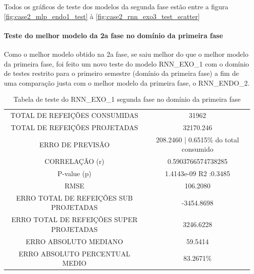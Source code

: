     	    Todos os gráficos de teste dos modelos da segunda fase estão entre a figura \ref{fig:case2_mlp_endo1_test} à \ref{fig:case2_rnn_exo3_test_scatter}

    	    \paragraph{Teste do melhor modelo da 2a fase no domínio da primeira fase}
    	        Como o melhor modelo obtido na 2a fase, se saiu melhor do que o melhor modelo da primeira fase, foi feito um novo teste do modelo RNN\_EXO\_1 com o domínio de testes restrito para o primeiro semestre (domínio da primeira fase) a fim de uma comparação justa com o melhor modelo da primeira fase, o RNN\_ENDO\_2.
    	        
                \begin{table}[!ht]
                \centering
                \caption{Tabela de teste do RNN\_EXO\_1 segunda fase no domínio da primeira fase}
                \label{table:case2_rnn_exo_2_incase1}
                    \begin{tabular}{|c|c|}
                    \rowcolor{gray!50}
                    \hline
                    \multicolumn{2}{c}{Melhor modelo da segunda fase testado no domínio do primeiro semestre da primeira fase}\\ \hline     
                    TOTAL DE REFEIÇÕES CONSUMIDAS & 31962\\
                    TOTAL DE REFEIÇÕES PROJETADAS & 32170.246\\
                    ERRO DE PREVISÃO & 208.2460 | 0.6515\% do total consumido\\
                    CORRELAÇÃO (r)& 0.5903766574738285 \\
                    P-value (p) & 1.4143e-09 R2 :0.3485\\
                    RMSE & 106.2080\\
                    ERRO TOTAL DE REFEIÇÕES SUB PROJETADAS & -3454.8698\\
                    ERRO TOTAL DE REFEIÇÕES SUPER PROJETADAS & 3246.6228\\
                    ERRO ABSOLUTO MEDIANO & 59.5414\\
                    ERRO ABSOLUTO PERCENTUAL MEDIO & 83.2671\% \\ \hline
                \end{tabular}
                \end{table}
